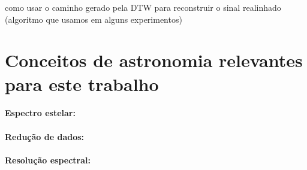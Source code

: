 como usar o caminho gerado pela DTW para reconstruir o sinal realinhado (algoritmo que usamos em alguns experimentos)

\section{Conceitos de astronomia relevantes para este trabalho}

\paragraph{Espectro estelar: }

\paragraph{Redução de dados: }

\paragraph{Resolução espectral: }